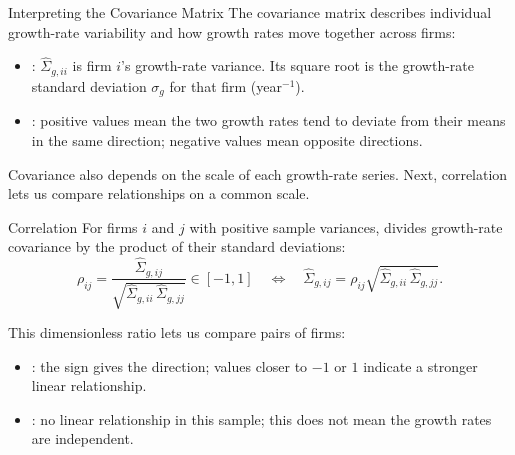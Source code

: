 \documentclass[aspectratio=169,11pt]{beamer}
\begin{document}
\begin{frame}{Interpreting the Covariance Matrix}
  The covariance matrix describes individual growth-rate variability and
  how growth rates move together across firms:

  \vspace{0.5em}
  \begin{itemize}\setlength{\itemsep}{0.8em}
    \item {}: $\hat\Sigma_{g,ii}$ is firm $i$'s
      growth-rate variance. Its square root is the growth-rate standard
      deviation $\sigma_g$ for that firm (year$^{-1}$).
    \item {}: positive values mean the two growth
      rates tend to deviate from their means in the same direction;
      negative values mean opposite directions.
  \end{itemize}

  \vspace{0.6em}
  Covariance also depends on the scale of each growth-rate series.
  Next, correlation lets us compare relationships on a common scale.
\end{frame}

\begin{frame}{Correlation}
  For firms $i$ and $j$ with positive sample variances, 
  divides growth-rate covariance by the product of their standard deviations:
  \[
    \boxed{\rho_{ij}=\frac{\hat\Sigma_{g,ij}}{\sqrt{\hat\Sigma_{g,ii}\,\hat\Sigma_{g,jj}}}\in[-1,1]
    \quad\Longleftrightarrow\quad
    \hat\Sigma_{g,ij}=\rho_{ij}\sqrt{\hat\Sigma_{g,ii}\,\hat\Sigma_{g,jj}}.}
  \]

  This dimensionless ratio lets us compare pairs of firms:

  \vspace{0.4em}
  \begin{itemize}\setlength{\itemsep}{0.6em}
    \item {}: the sign gives the direction;
      values closer to $-1$ or $1$ indicate a stronger linear relationship.
    \item {}: no linear relationship in this sample;
      this does not mean the growth rates are independent.
  \end{itemize}
\end{frame}
\end{document}
